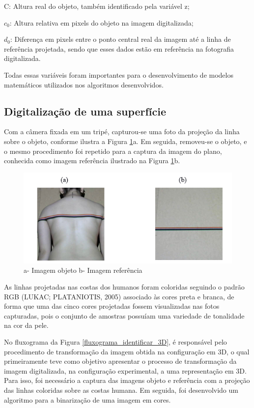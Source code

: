 \documentclass[a4paper, 12pt]{article}
\begin{document}
C: Altura real do objeto, também identificado pela variável z;

$c_0$: Altura relativa em pixels do objeto na imagem digitalizada;

$d_0$: Diferença em pixels entre o ponto central real da imagem até a linha de referência projetada, sendo que esses dados estão em referência na fotografia digitalizada. 
 
Todas essas variáveis foram importantes para o desenvolvimento de modelos matemáticos utilizados nos algoritmos desenvolvidos. 

\subsection{Digitalização de uma superfície}

Com a câmera fixada em um tripé, capturou-se uma foto da projeção da linha sobre o objeto, conforme ilustra a Figura \ref{imagem_projecao_colorida}a. Em seguida, removeu-se o objeto, e o mesmo procedimento foi repetido para a captura da imagem do plano, conhecida como imagem referência ilustrado na Figura \ref{imagem_projecao_colorida}b. 

\begin{figure}[H]
	\centering
		\includegraphics[width=.55\linewidth]{imagem_projecao_colorida.png}
	\caption{a- Imagem objeto b- Imagem referência}
	\label{imagem_projecao_colorida}
\end{figure}

As linhas projetadas nas costas dos humanos foram coloridas seguindo o padrão RGB (LUKAC; PLATANIOTIS, 2005) associado às cores preta e branca, de forma que uma das cinco cores projetadas fossem visualizadas nas fotos capturadas, pois o conjunto de amostras possuíam uma variedade de tonalidade na cor da pele.

No fluxograma da Figura \ref{fluxograma_identificar_3D}, é responsável pelo procedimento de transformação da imagem obtida na configuração em 3D, o qual primeiramente teve como objetivo apresentar o processo de transformação da imagem digitalizada, na configuração experimental, a uma representação em 3D. Para isso, foi necessário a captura das imagens objeto e referência com a projeção das linhas coloridas sobre as costas humana. Em seguida, foi desenvolvido um algoritmo para a binarização de uma imagem em cores.
\end{document}
